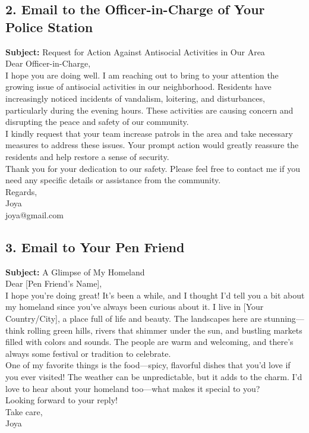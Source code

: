 \documentclass{article}
\begin{document}
\subsection*{2. Email to the Officer-in-Charge of Your Police Station}
\textbf{Subject:} Request for Action Against Antisocial Activities in Our Area \\
Dear Officer-in-Charge, \\
I hope you are doing well. I am reaching out to bring to your attention the growing issue of antisocial activities in our neighborhood. Residents have increasingly noticed incidents of vandalism, loitering, and disturbances, particularly during the evening hours. These activities are causing concern and disrupting the peace and safety of our community. \\
I kindly request that your team increase patrols in the area and take necessary measures to address these issues. Your prompt action would greatly reassure the residents and help restore a sense of security. \\
Thank you for your dedication to our safety. Please feel free to contact me if you need any specific details or assistance from the community. \\
Regards, \\
Joya \\
joya@gmail.com \\
\subsection*{3. Email to Your Pen Friend}
\textbf{Subject:} A Glimpse of My Homeland \\
Dear [Pen Friend’s Name], \\
I hope you’re doing great! It’s been a while, and I thought I’d tell you a bit about my homeland since you’ve always been curious about it. I live in [Your Country/City], a place full of life and beauty. The landscapes here are stunning—think rolling green hills, rivers that shimmer under the sun, and bustling markets filled with colors and sounds. The people are warm and welcoming, and there’s always some festival or tradition to celebrate. \\
One of my favorite things is the food—spicy, flavorful dishes that you’d love if you ever visited! The weather can be unpredictable, but it adds to the charm. I’d love to hear about your homeland too—what makes it special to you? \\
Looking forward to your reply! \\
Take care, \\
Joya \\
\end{document}

